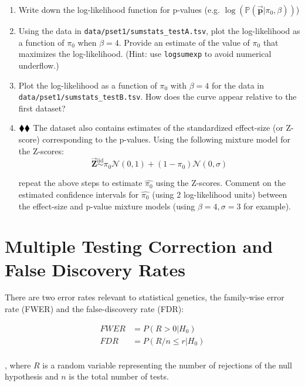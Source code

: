 \documentclass{pset}
\begin{document}
\begin{enumerate}
\item Write down the log-likelihood function for p-values (e.g. $\log (\mathbb{P}(\overrightarrow{\mathbf{p}} | \pi_0, \beta))$)
\item Using the data in \texttt{data/pset1/sumstats\_testA.tsv}, plot the log-likelihood as a function of $\pi_0$ when $\beta = 4$. Provide an estimate of the value of $\pi_0$ that maximizes the log-likelihood. (Hint: use \texttt{logsumexp} to avoid numerical underflow.)
\item Plot the log-likelihood as a function of $\pi_0$ with $\beta = 4$ for the data in \texttt{data/pset1/sumstats\_testB.tsv}. How does the curve appear relative to the first dataset?
\item $\mathbin{\blacklozenge}\mathbin{\blacklozenge}$ The dataset also contains estimates of the standardized effect-size (or Z-score) corresponding to the p-values. Using the following mixture model for the Z-scores: 
$$\overrightarrow{\mathbf{Z}} \overset{\text{iid}}{\sim} \pi_0 \mathcal{N}(0,1) + (1 - \pi_0)\mathcal{N}(0,\sigma)$$

repeat the above steps to estimate $\hat{\pi_0}$ using the Z-scores. Comment on the estimated confidence intervals for $\hat{\pi_0}$ (using 2 log-likelihood units) between the effect-size and p-value mixture models (using $\beta=4,\sigma=3$ for example).

\end{enumerate}

\section*{Multiple Testing Correction and False Discovery Rates}

There are two error rates relevant to statistical genetics, the family-wise error rate (FWER) and the false-discovery rate (FDR):

$$
\begin{aligned}
FWER &= P(R > 0 | H_0)\\
FDR &= P(R/n \leq r | H_0)\\
\end{aligned}
$$

, where $R$ is a random variable representing the number of rejections of the null hypothesis and $n$ is the total number of tests. 
\end{document}

